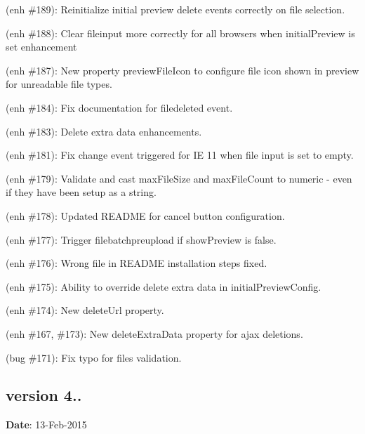 \begin{DoxyItemize}
\item (enh \#189)\+: Reinitialize initial preview delete events correctly on file selection.
\item (enh \#188)\+: Clear fileinput more correctly for all browsers when initial\+Preview is set enhancement
\item (enh \#187)\+: New property {\ttfamily preview\+File\+Icon} to configure file icon shown in preview for unreadable file types.
\item (enh \#184)\+: Fix documentation for filedeleted event.
\item (enh \#183)\+: Delete extra data enhancements.
\item (enh \#181)\+: Fix change event triggered for IE 11 when file input is set to empty.
\item (enh \#179)\+: Validate and cast {\ttfamily max\+File\+Size} and {\ttfamily max\+File\+Count} to numeric -\/ even if they have been setup as a string.
\item (enh \#178)\+: Updated R\+E\+A\+D\+ME for cancel button configuration.
\item (enh \#177)\+: Trigger filebatchpreupload if show\+Preview is {\ttfamily false}.
\item (enh \#176)\+: Wrong file in R\+E\+A\+D\+ME installation steps fixed.
\item (enh \#175)\+: Ability to override delete extra data in {\ttfamily initial\+Preview\+Config}.
\item (enh \#174)\+: New {\ttfamily delete\+Url} property.
\item (enh \#167, \#173)\+: New {\ttfamily delete\+Extra\+Data} property for ajax deletions.
\item (bug \#171)\+: Fix typo for files validation.
\end{DoxyItemize}

\subsection*{version 4..}

{\bfseries Date}\+: 13-\/\+Feb-\/2015


